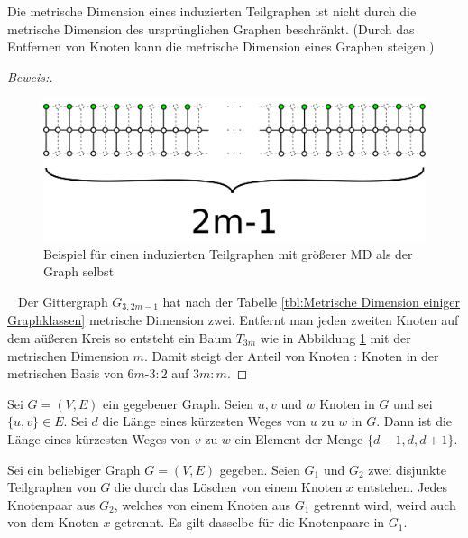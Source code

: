 \begin{lem}
Die metrische Dimension eines induzierten Teilgraphen ist nicht durch die metrische Dimension des ursprünglichen Graphen beschränkt. (Durch das Entfernen von Knoten kann die metrische Dimension eines Graphen steigen.)
\end{lem}
\begin{proof}[Beweis:]$\;$
\begin{figure}[h!]
		\centering 		 
\includegraphics[width=420pt]{bilder/gitterzubaumlsch2.pdf}
   \caption{Beispiel für einen induzierten Teilgraphen mit größerer MD als der Graph selbst}
   \label{bild:Gitterbaum2}
  	 \end{figure}
\textcolor{white}{x}\newline
Der Gittergraph $G_{3,2m-1}$ hat nach der Tabelle \ref{tbl:Metrische Dimension einiger Graphklassen} metrische Dimension zwei. Entfernt man jeden zweiten Knoten auf dem aüßeren Kreis so entsteht ein Baum $T_{3m}$ wie in Abbildung \ref{bild:Gitterbaum2} mit der metrischen Dimension $m$. Damit steigt der Anteil von Knoten : Knoten in der metrischen Basis von $6m$-$3:2$ auf $3m:m$.
\end{proof}
\begin{lem}
\label{dist}
Sei $G=(V,E)$ ein gegebener Graph. Seien $u,v$ und $w$ Knoten in $G$ und sei $\{u,v\}\in E$. Sei $d$ die Länge eines kürzesten Weges von $u$ zu $w$ in $G$. Dann ist die Länge eines kürzesten Weges von $v$ zu $w$ ein Element der Menge $\{d-1,d,d+1\}$.\cite{landmarks}
\end{lem}
\begin{lem}
\label{trennungsknoten}
Sei ein beliebiger Graph $G=(V,E)$ gegeben. Seien $G_1$ und $G_2$ zwei disjunkte Teilgraphen von $G$ die durch das Löschen von einem Knoten $x$ entstehen. Jedes Knotenpaar aus $G_2$, welches von einem Knoten aus $G_1$ getrennt wird, weird auch von dem Knoten $x$ getrennt. Es gilt dasselbe für die Knotenpaare in $G_1$.
\end{lem}
